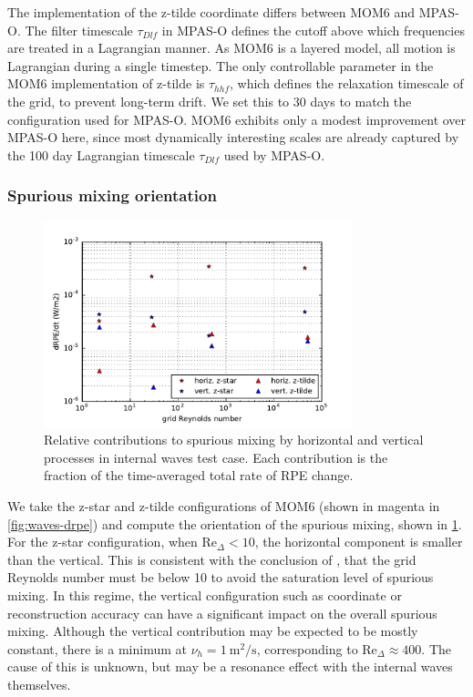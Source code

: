 The implementation of the z-tilde coordinate differs between MOM6 and MPAS-O. The filter timescale $\tau_{Dlf}$ in MPAS-O defines the cutoff above which frequencies are treated in a Lagrangian manner. As MOM6 is a layered model, all motion is Lagrangian during a single timestep. The only controllable parameter in the MOM6 implementation of z-tilde is $\tau_{hhf}$, which defines the relaxation timescale of the grid, to prevent long-term drift. We set this to 30 days to match the configuration used for MPAS-O. MOM6 exhibits only a modest improvement over MPAS-O here, since most dynamically interesting scales are already captured by the 100 day Lagrangian timescale $\tau_{Dlf}$ used by MPAS-O.

\subsubsection{Spurious mixing orientation}
\begin{figure}
  \includegraphics[width=0.8\textwidth]{../plots/internal_waves_drpe_split_abs.pdf}
  \caption{\label{fig:waves-drpesplit} Relative contributions to spurious mixing by horizontal and vertical processes in internal waves test case. Each contribution is the fraction of the time-averaged total rate of RPE change.}
\end{figure}

We take the z-star and z-tilde configurations of MOM6 (shown in magenta in \cref{fig:waves-drpe}) and compute the orientation of the spurious mixing, shown in \cref{fig:waves-drpesplit}. For the z-star configuration, when $\mathrm{Re}_\Delta < 10$, the horizontal component is smaller than the vertical. This is consistent with the conclusion of \citet{ilicak12}, that the grid Reynolds number must be below 10 to avoid the saturation level of spurious mixing. In this regime, the vertical configuration such as coordinate or reconstruction accuracy can have a significant impact on the overall spurious mixing. Although the vertical contribution may be expected to be mostly constant, there is a minimum at $\nu_h = \SI{1}{\square\metre\per\second}$, corresponding to $\mathrm{Re}_\Delta \approx 400$. The cause of this is unknown, but may be a resonance effect with the internal waves themselves.


